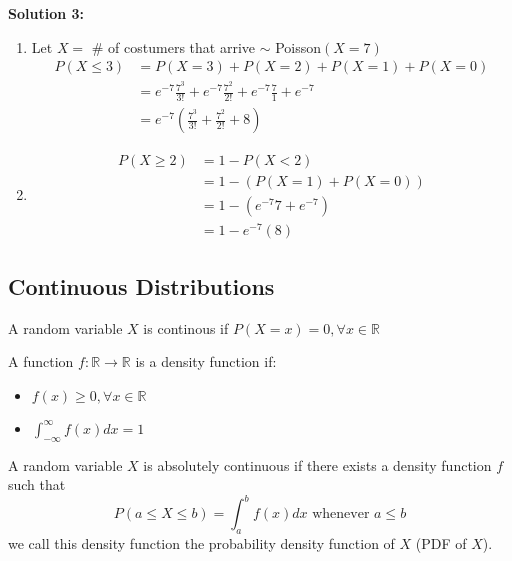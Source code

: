 \documentclass[12pt]{article}
\begin{document}
\textbf{Solution 3:}
\begin{enumerate}
	\item{
	Let $X = $ \# of costumers that arrive $\sim$ Poisson$(X = 7)$
	\begin{align*}
		P(X \leq 3) &= P(X = 3) + P(X = 2) + P(X = 1) + P(X = 0)\\
		&= e^{-7} \frac{7^3}{3!} + e^{-7} \frac{7^2}{2!} + e^{-7} \frac{7}{1} + e^{-7}\\
		&= e^{-7} (\frac{7^3}{3!} + \frac{7^2}{2!} + 8)
	\end{align*}
	}
	\item{
	\begin{align*}
		P(X \geq 2) &= 1 - P(X < 2)\\
		&= 1 - (P(X = 1) + P(X = 0))\\
		&= 1 - (e^{-7}7 + e^{-7})\\
		&= 1 - e^{-7}(8)
	\end{align*}
	}
\end{enumerate}

\subsection{Continuous Distributions}

\begin{tcolorbox}[title=Definition: Continuous Random Variables]
	A random variable $X$ is continous if $P(X = x) = 0,  \forall x \in\mathbb{R}$
\end{tcolorbox}

\begin{tcolorbox}[title=Definition: Density Function]
	A function $f:\mathbb{R} \longrightarrow \mathbb{R}$ is a density function if:
	\begin{itemize}
		\item{$f(x) \geq 0, \forall x \in\mathbb{R}$}
		\item{$\int_{-\infty}^{\infty} f(x) dx = 1$}
	\end{itemize}
\end{tcolorbox}

\begin{tcolorbox}[title=Definition: Absolutely Continuous Random Variables]
	A random variable $X$ is absolutely continuous if there exists a density function $f$ such that $$P(a \leq X \leq b ) = \int_{a}^{b} f(x) dx \text{ whenever } a \leq b$$
	we call this density function the probability density function of $X$ (PDF of $X$).
\end{tcolorbox}
\end{document}
